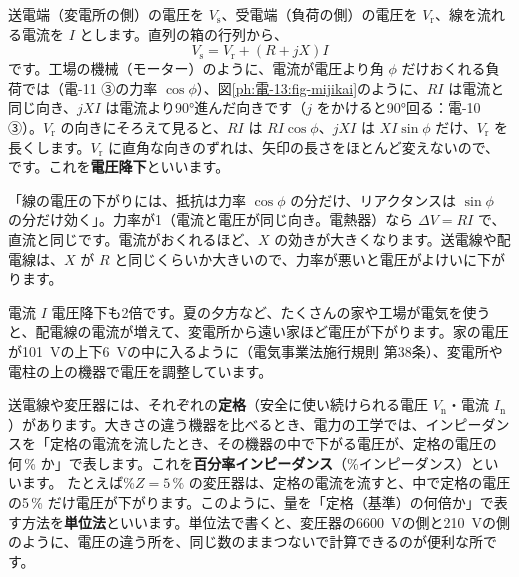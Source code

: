 \noindent 送電端（変電所の側）の電圧を $V_{\mathrm s}$、受電端（負荷の側）の電圧を $V_{\mathrm r}$、線を流れる電流を $I$ とします。直列の箱の行列から、
\[V_{\mathrm s}=V_{\mathrm r}+(R+jX)I\]
です。工場の機械（モーター）のように、電流が電圧より角 $\phi$ だけおくれる負荷では（電-11 ③の力率 $\cos\phi$）、図\ref{ph:電-13:fig-mijikai}のように、$RI$ は電流と同じ向き、$jXI$ は電流より90°進んだ向きです（$j$ をかけると90°回る：電-10 ③）。$V_{\mathrm r}$ の向きにそろえて見ると、$RI$ は $RI\cos\phi$、$jXI$ は $XI\sin\phi$ だけ、$V_{\mathrm r}$ を長くします。$V_{\mathrm r}$ に直角な向きのずれは、矢印の長さをほとんど変えないので、
\label{ph:電-13:koka}です。これを\textbf{電圧降下}といいます。

\begin{phyomi}
「線の電圧の下がりには、抵抗は力率 $\cos\phi$ の分だけ、リアクタンスは $\sin\phi$ の分だけ効く」。力率が1（電流と電圧が同じ向き。電熱器）なら $\Delta V=RI$ で、直流と同じです。電流がおくれるほど、$X$ の効きが大きくなります。送電線や配電線は、$X$ が $R$ と同じくらいか大きいので、力率が悪いと電圧がよけいに下がります。
\end{phyomi}

\begin{phmodel}[短い線]
\end{phmodel}

\begin{phbaisuru}{電流 $I$}
電圧降下も2倍です。夏の夕方など、たくさんの家や工場が電気を使うと、配電線の電流が増えて、変電所から遠い家ほど電圧が下がります。家の電圧が\qty{101}{V}の上下\qty{6}{V}の中に入るように（電気事業法施行規則 第38条）、変電所や電柱の上の機器で電圧を調整しています。
\end{phbaisuru}

\label{ph:電-13:sec5}
送電線や変圧器には、それぞれの\textbf{定格}（安全に使い続けられる電圧 $V_{\mathrm n}$・電流 $I_{\mathrm n}$）があります。大きさの違う機器を比べるとき、電力の工学では、インピーダンスを「定格の電流を流したとき、その機器の中で下がる電圧が、定格の電圧の何\,\% か」で表します。これを\textbf{百分率インピーダンス}（\%インピーダンス）といいます。
たとえば\%$Z=5\,\%$ の変圧器は、定格の電流を流すと、中で定格の電圧の5\,\% だけ電圧が下がります。このように、量を「定格（基準）の何倍か」で表す方法を\textbf{単位法}といいます。単位法で書くと、変圧器の\qty{6600}{V}の側と\qty{210}{V}の側のように、電圧の違う所を、同じ数のままつないで計算できるのが便利な所です。

